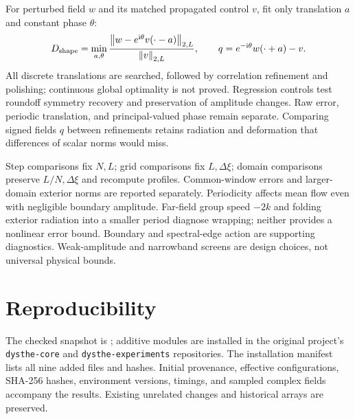\documentclass[11pt]{article}
\newcommand{\ii}{\mathrm{i}}
\newcommand{\normtwo}[1]{\left\lVert #1\right\rVert_{2,L}}
\begin{document}
For perturbed field $w$ and its matched propagated control $v$, fit only
translation $a$ and constant phase $\theta$:
\begin{equation}\label{eq:fit}
 D_{\rm shape}=\min_{a,\theta}
 \frac{\normtwo{w-e^{\ii\theta}v(\cdot-a)}}{\normtwo{v}},\qquad
 q=e^{-\ii\theta}w(\cdot+a)-v.
\end{equation}
All discrete translations are searched, followed by correlation refinement
and polishing; continuous global optimality is not proved. Regression
controls test roundoff symmetry recovery and preservation of amplitude
changes. Raw error, periodic translation, and principal-valued phase remain
separate. Comparing signed fields $q$ between refinements retains radiation
and deformation that differences of scalar norms would miss.

Step comparisons fix $N,L$; grid comparisons fix $L,\Delta\xi$; domain
comparisons preserve $L/N,\Delta\xi$ and recompute profiles. Common-window
errors and larger-domain exterior norms are reported separately.
Periodicity affects mean flow even with negligible boundary amplitude.
Far-field group speed $-2k$ and folding exterior radiation into a smaller
period diagnose wrapping; neither provides a nonlinear error bound.
Boundary and spectral-edge action are supporting diagnostics. Weak-amplitude
and narrowband screens are design choices, not universal physical bounds.



\clearpage
\section{Reproducibility}
The checked snapshot is ; additive modules are installed
in the original project's \texttt{dysthe-core} and \texttt{dysthe-experiments}
repositories. The installation manifest lists all nine added files and hashes.
Initial provenance, effective
configurations, SHA-256 hashes, environment versions, timings, and sampled
complex fields accompany the results. Existing unrelated changes and
historical arrays are preserved.
\end{document}
